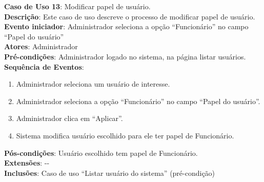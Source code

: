 \documentclass[]{politex}
\begin{document}
\noindent \textbf{Caso de Uso 13}: Modificar papel de usuário. \\
\textbf{Descrição}: Este caso de uso descreve o processo de modificar papel de
usuário. \\
\textbf{Evento iniciador}: Administrador seleciona a opção ``Funcionário'' no campo
``Papel do usuário'' \\
\textbf{Atores}: Administrador \\
\textbf{Pré-condições}: Administrador logado no sistema, na página listar
usuários. \\
\textbf{Sequência de Eventos}:
\begin{enumerate}
\item Administrador seleciona um usuário de interesse.
\item Administrador seleciona a opção ``Funcionário'' no campo ``Papel do usuário''.
\item Administrador clica em ``Aplicar''.
\item Sistema modifica usuário escolhido para ele ter papel de Funcionário.
\end{enumerate}
\textbf{Pós-condições}: Usuário escolhido tem papel de Funcionário. \\
\textbf{Extensões}: -{}- \\
\textbf{Inclusões}: Caso de uso ``Listar usuário do sistema'' (pré-condição) \\


%

%
\end{document}
